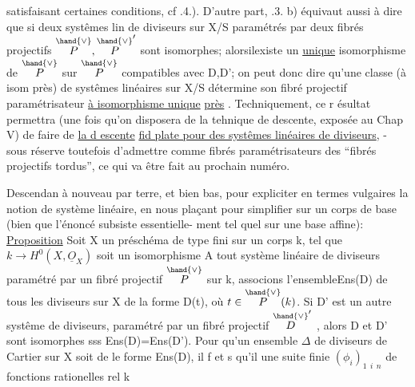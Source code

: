 
satisfaisant certaines conditions, cf .4.). D'autre part, \hand{\S}.3. b)
équivaut  aussi à dire que  si deux systêmes lin de diviseurs
sur X/S  paramétrés par deux fibrés projectifs $\overset{\hand{\vee}}{P},\overset{\hand{\vee}}{P}'$ sont isomorphes;
alorsilexiste un \uline{unique} isomorphisme de $\overset{\hand{\vee}}{P}$ sur $\overset{\hand{\vee}}{P}$ compatibles avec D,D';
on peut donc dire qu'une classe (à isom près) de systêmes linéaires sur
X/S détermine son fibré projectif paramétrisateur \uline{à isomorphisme unique}
\uline{près} . Techniquement, ce r ésultat permettra (une fois qu'on disposera
de la tehnique de descente, exposée au Chap V) de faire de \uline{la d escente}
\uline{fid plate pour des systêmes linéaires de diviseurs}, - sous réserve
 toutefois d'admettre  comme fibrés paramétrisateurs des ``fibrés projectifs
tordus'', ce qui va être fait au prochain  numéro.

Descendan à nouveau par terre, et bien bas, pour expliciter en
termes vulgaires la notion de système linéaire, en nous plaçant pour
simplifier sur un corps de base (bien que l'énoncé subsiste essentielle-%
ment tel quel sur une base affine):
\uline{Proposition}  Soit X un préschéma   de type fini sur un corps k,
tel que $k\to H^0(X,\underline{O}_X)$ soit un isomorphisme A tout système linéaire  de
diviseurs   paramétré par un fibré projectif $\overset{\hand{\vee}}{P}$ sur k, associons
l'ensemble\hand{(!)}Ens(D) de tous les diviseurs sur X de la forme D(t), où
$t\in\overset{\hand{\vee}}{P}(k)$.  Si  D' est un autre systême  de diviseurs, paramétré par un
fibré projectif $\overset{\hand{\vee}}{D}'$ , alors D et D' sont isomorphes sss Ens(D)=Ens(D').
 
\hand{(}Pour qu'un ensemble $\Delta$ de diviseurs de Cartier  sur X soit de
le forme Ens(D), il f et s qu'il  
 une suite finie $(\phi_i)_{1\ \ i\ \ n}$ de fonctions
rationelles rel k 

